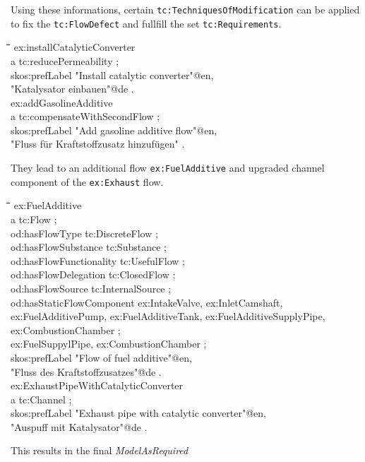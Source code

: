 \documentclass[a4paper,11pt]{article}
\newenvironment{code}{\tt \begin{tabbing}
\hskip12pt\=\hskip12pt\=\hskip12pt\=\hskip12pt\=\hskip5cm\=\hskip5cm\=\kill}
{\end{tabbing}}
\begin{document}
Using these informations, certain \texttt{tc:TechniquesOfModification} can be
applied to fix the \texttt{tc:FlowDefect} and fullfill the set
\texttt{tc:Requirements}.

\begin{code}
ex:installCatalyticConverter \\
\> a tc:reducePermeability ; \\
\> skos:prefLabel "Install catalytic converter"@en,\\
\>\> "Katalysator einbauen"@de .  \\[6pt]

ex:addGasolineAdditive \\
\> a tc:compensateWithSecondFlow ; \\
\> skos:prefLabel "Add gasoline additive flow"@en,\\
\>\> "Fluss für Kraftstoffzusatz hinzufügen" . 
\end{code}
They lead to an additional flow \texttt{ex:FuelAdditive} and upgraded channel
component of the \texttt{ex:Exhaust} flow.
\begin{code}
ex:FuelAdditive \\
\> a tc:Flow ; \\
\> od:hasFlowType tc:DiscreteFlow ; \\
\> od:hasFlowSubstance tc:Substance ; \\
\> od:hasFlowFunctionality tc:UsefulFlow ; \\
\> od:hasFlowDelegation tc:ClosedFlow ; \\
\> od:hasFlowSource tc:InternalSource ; \\
\> od:hasStaticFlowComponent ex:IntakeValve, ex:InletCamshaft, \+\\
\> ex:FuelAdditivePump, ex:FuelAdditiveTank, ex:FuelAdditiveSupplyPipe, \\
\> ex:CombustionChamber ; \-\\
\> ex:FuelSuppylPipe, ex:CombustionChamber ; \\
\> skos:prefLabel "Flow of fuel additive"@en,\\
\>\> "Fluss des Kraftstoffzusatzes"@de . \\[6pt]

ex:ExhaustPipeWithCatalyticConverter \\
\> a tc:Channel ; \\
\> skos:prefLabel "Exhaust pipe with catalytic converter"@en,\\
\>\> "Auspuff mit Katalysator"@de . 
\end{code}
This results in the final \emph{ModelAsRequired}
\end{document}
